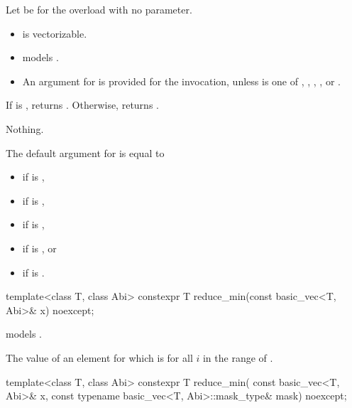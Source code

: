 \begin{itemdescr}
\pnum
Let  be  for the overload with no  parameter.

\pnum
\constraints
\begin{itemize}
\item {} is vectorizable.
\item {} models
  .
\item An argument for  is provided for the invocation,
  unless  is one of , ,
  , , or .
\end{itemize}

\pnum
\returns
If  is , returns .
Otherwise, returns .

\pnum
\throws
Nothing.

\pnum
\remarks
The default argument for  is equal to
\begin{itemize}
\item {} if  is ,
\item {} if  is ,
\item {} if  is ,
\item {} if  is , or
\item {} if  is .
\end{itemize}
\end{itemdescr}

\begin{itemdecl}
template<class T, class Abi> constexpr T reduce_min(const basic_vec<T, Abi>& x) noexcept;
\end{itemdecl}

\begin{itemdescr}
\pnum
\constraints
{} models .

\pnum
\returns
The value of an element  for which  is
 for all $i$ in the range of .
\end{itemdescr}

\begin{itemdecl}
template<class T, class Abi>
  constexpr T reduce_min(
    const basic_vec<T, Abi>& x, const typename basic_vec<T, Abi>::mask_type& mask) noexcept;
\end{itemdecl}

